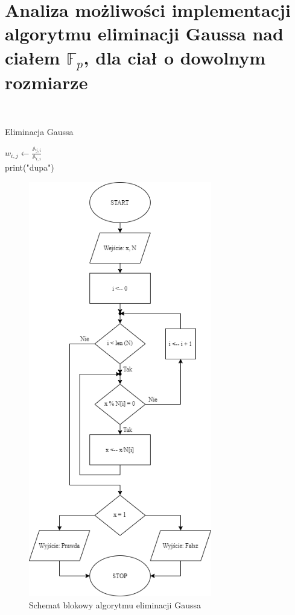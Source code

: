 \documentclass[]{article}
\begin{document}
\section{Analiza możliwości implementacji algorytmu eliminacji Gaussa nad ciałem $\mathbb{F}_p$, dla ciał o dowolnym rozmiarze}~
	\begin{algorithm}
		\SetAlgoLined
		\caption{Eliminacja Gaussa}
		\label{Gauss}
		{
			\(w_{i,j} \gets \frac{\mathbb{A}_{j,i}}{\mathbb{A}_{i,i}}\)\\
			{
				print("dupa")
			}
		}

	\end{algorithm}

\begin{figure}[h]
	\begin{center}
		\includegraphics[width=8cm]{./img/3.png}
		\caption{Schemat blokowy algorytmu eliminacji Gaussa}
	\end{center}
\end{figure}
\end{document}
